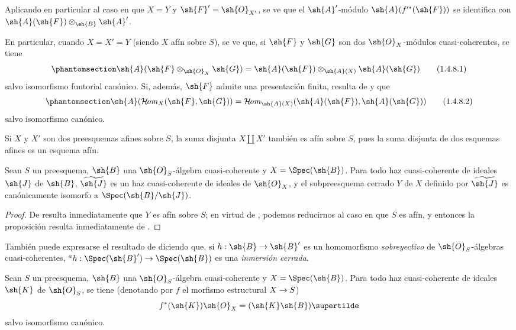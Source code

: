 \documentclass[oneside,10pt]{amsart}
\makeatletter
\newcommand{\ega@arrow}[2]{\mathchoice{#1}{#2}{#2}{#2}}
\renewcommand{\to}{\ega@arrow{\longrightarrow}{\rightarrow}}
\def\shHom{\mathcal{H}\!\mathit{om}}
\newcommand{\oldpage}[2][]{\marginnote{\normalfont\footnotesize\textbf{#1}~|~#2}\ignorespaces}
\let\EGAOriginalLabel\label
\renewcommand{\label}[1]{\phantomsection\EGAOriginalLabel{#1}}
\makeatother
\begin{document}
Aplicando en particular  al caso en que $X=Y$ y $\sh{F}'=\sh{O}_{X'}$, se ve que el $\sh{A}'$-módulo $\sh{A}(f^{\prime*}(\sh{F}))$ se identifica con $\sh{A}(\sh{F})\otimes_\sh{B}\sh{A}'$.

\begin{env}[1.4.8]
\label{II.1.4.8}
En particular, cuando $X=X'=Y$ (siendo $X$ afín sobre $S$), se ve que, si $\sh{F}$ y $\sh{G}$ son dos $\sh{O}_X$-módulos cuasi-coherentes, se tiene
\[
\label{II.1.4.8.1}
  \sh{A}(\sh{F}\otimes_{\sh{O}_X}\sh{G})
  =\sh{A}(\sh{F})\otimes_{\sh{A}(X)}\sh{A}(\sh{G})
  \tag{1.4.8.1}
\]
salvo isomorfismo funtorial canónico.
Si, además, $\sh{F}$ admite una presentación finita, resulta de  y  que
\[
\label{II.1.4.8.2}
  \sh{A}(\shHom_X(\sh{F},\sh{G}))
  =\shHom_{\sh{A}(X)}(\sh{A}(\sh{F}),\sh{A}(\sh{G}))
  \tag{1.4.8.2}
\]
salvo isomorfismo canónico.
\end{env}

\begin{remark}[1.4.9]
\label{II.1.4.9}
Si $X$ y $X'$ son dos preesquemas afines sobre $S$, la suma disjunta $X\amalg X'$ también es afín sobre $S$, pues la suma disjunta de dos esquemas afines es un esquema afín.
\end{remark}

\begin{proposition}[1.4.10]
\label{II.1.4.10}
Sean $S$ un preesquema, $\sh{B}$ una $\sh{O}_S$-álgebra cuasi-coherente y $X=\Spec(\sh{B})$.
Para todo haz cuasi-coherente de ideales $\sh{J}$ de $\sh{B}$, $\widetilde{\sh{J}}$ es un haz cuasi-coherente de ideales de $\sh{O}_X$, y el subpreesquema cerrado $Y$ de $X$ definido por $\widetilde{\sh{J}}$ es canónicamente isomorfo a $\Spec(\sh{B}/\sh{J})$.
\end{proposition}

\begin{proof}
De  resulta inmediatamente que $Y$ es afín sobre $S$; en virtud de , podemos reducirnos al caso en que $S$ es afín, y entonces la proposición resulta inmediatamente de .
\end{proof}

También puede expresarse el resultado de  diciendo que, si $h:\sh{B}\to\sh{B}'$ es un homomorfismo \emph{sobreyectivo} de $\sh{O}_S$-álgebras cuasi-coherentes, ${}^a h:\Spec(\sh{B}')\to\Spec(\sh{B})$ es una \emph{inmersión cerrada}.

\begin{proposition}[1.4.11]
\label{II.1.4.11}
\oldpage[II]{12}
Sean $S$ un preesquema, $\sh{B}$ una $\sh{O}_S$-álgebra cuasi-coherente y $X=\Spec(\sh{B})$.
Para todo haz cuasi-coherente de ideales $\sh{K}$ de $\sh{O}_S$, se tiene (denotando por $f$ el morfismo estructural $X\to S$)
\[
  f^*(\sh{K})\sh{O}_X=(\sh{K}\sh{B})\supertilde
\]
salvo isomorfismo canónico.
\end{proposition}
\end{document}
